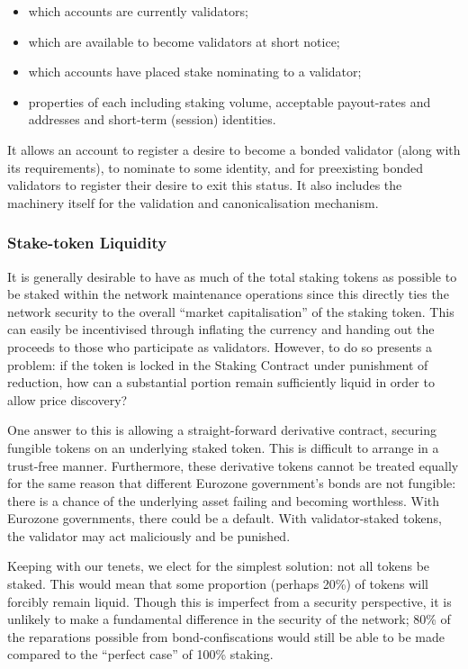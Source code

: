 \documentclass[9pt,oneside]{amsart}
\providecommand{\tightlist}{%
  \setlength{\itemsep}{0pt}\setlength{\parskip}{0pt}}
\begin{document}
\begin{multicols}{2}
\begin{itemize}
\tightlist
\item which accounts are currently validators;
\item which are available to become validators at short notice;
\item which accounts have placed stake nominating to a validator;
\item properties of each including staking volume, acceptable payout-rates and addresses and short-term (session) identities.
\end{itemize}

 It allows an account to register a desire to become a bonded validator (along with its requirements), to nominate to some identity, and for preexisting bonded validators to register their desire to exit this status. It also includes the machinery itself for the validation and canonicalisation mechanism.

\subsubsection{Stake-token Liquidity}
\label{stake-token-liquidity}

 It is generally desirable to have as much of the total staking tokens as possible to be staked within the network maintenance operations since this directly ties the network security to the overall ``market capitalisation'' of the staking token. This can easily be incentivised through inflating the currency and handing out the proceeds to those who participate as validators. However, to do so presents a problem: if the token is locked in the Staking Contract under punishment of reduction, how can a substantial portion remain sufficiently liquid in order to allow price discovery?

 One answer to this is allowing a straight-forward derivative contract, securing fungible tokens on an underlying staked token. This is difficult to arrange in a trust-free manner. Furthermore, these derivative tokens cannot be treated equally for the same reason that different Eurozone government's bonds are not fungible: there is a chance of the underlying asset failing and becoming worthless. With Eurozone governments, there could be a default. With validator-staked tokens, the validator may act maliciously and be punished.

 Keeping with our tenets, we elect for the simplest solution: not all tokens be staked. This would mean that some proportion (perhaps 20\%) of tokens will forcibly remain liquid. Though this is imperfect from a security perspective, it is unlikely to make a fundamental difference in the security of the network; 80\% of the reparations possible from bond-confiscations would still be able to be made compared to the ``perfect case'' of 100\% staking.


\end{multicols}
\end{document}
